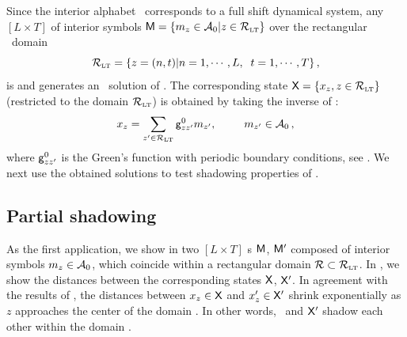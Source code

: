 \documentclass[12pt]{iopart}
\begin{document}
Since the interior alphabet \Ai\ corresponds to a full shift
dynamical system,  any $[L\!\times\!T]$ {\brick} of interior symbols
$\mathsf{M}= \{{m_{z}}\in\mathcal{A}_0|z\in \mathcal{R}_{\scriptscriptstyle\mathrm{LT}} \}$
over the rectangular \spt\ domain
\[
\mathcal{R}_{\scriptscriptstyle\mathrm{LT}}=\{z=(n,t)| n=1,\cdots,L,\;\; t=1,\cdots,T\}
\,,
\] is {\admissible} and generates an \twot\ solution of .
The corresponding {\spt} state  $\mathsf{X} =\{x_z, z\in \mathcal{R}_{\scriptscriptstyle\mathrm{LT}}\}$ (restricted to the domain $\mathcal{R}_{\scriptscriptstyle\mathrm{LT}}$)
is obtained
by taking the inverse of :
\begin{equation}
   x_z=\sum_{z'\in \mathcal{R}_{\scriptscriptstyle\mathrm{LT}}} \mathsf{g}^0_{zz'} {m_{z'}}, \hspace*{25pt}    {m_{z'}}\in \mathcal{A}_0
\,,
\end{equation}
where $\mathsf{g}^0_{zz'}$ is the Green's function with periodic boundary
conditions, see .
We next use the obtained solutions
to test shadowing  properties of \twots.

\subsection{Partial shadowing}
\label{sect:partShade}

As the first application, we show  in  two
$[L\!\times\!T]$ \brick s $\mathsf{M}$, $\mathsf{M}'$ composed of interior symbols
$m_z\in \mathcal{A}_0$, which coincide within a   rectangular  domain
$\mathcal{R}\subset\mathcal{R}_{\scriptscriptstyle\mathrm{LT}}$. In  , we  show the distances between
the corresponding {\spt} states $\mathsf{X}$, $\mathsf{X}'$. In agreement with the
results of , the distances between
$x_z\in\mathsf{X}$ and $x_z'\in\mathsf{X}'$ shrink exponentially as $z$
approaches the center of the domain \R. In other words, \Xx\ and $\mathsf{X}'$
shadow each other within the domain \R.
\end{document}
